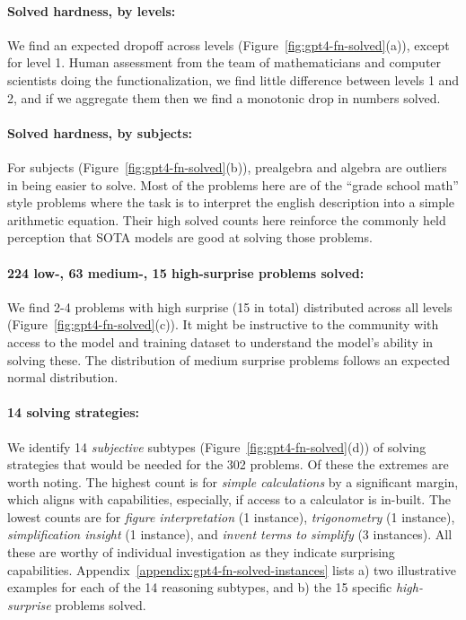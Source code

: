 \documentclass[11pt,a4paper]{article}
\begin{document}
\paragraph{Solved hardness, by levels:} We find an expected dropoff across
levels (Figure~\ref{fig:gpt4-fn-solved}(a)), except for level 1. Human
assessment from the team of mathematicians and computer scientists doing the
functionalization, we find little difference between levels 1 and 2, and if we
aggregate them then we find a monotonic drop in numbers solved.

\paragraph{Solved hardness, by subjects:} For subjects
(Figure~\ref{fig:gpt4-fn-solved}(b)), prealgebra and algebra are outliers in
being easier to solve. Most of the problems here are of the ``grade school
math'' style problems where the task is to interpret the english description
into a simple arithmetic equation. Their high solved counts here reinforce the
commonly held perception that SOTA models are good at solving those problems.

\paragraph{224 low-, 63 medium-, 15 high-surprise problems solved:} We find 2-4
problems with high surprise (15 in total) distributed across all levels
(Figure~\ref{fig:gpt4-fn-solved}(c)). It might be instructive to the community
with access to the model and training dataset to understand the model's ability
in solving these. The distribution of medium surprise problems follows an
expected normal distribution.

\paragraph{14 solving strategies:} We identify 14 {\em subjective} subtypes
(Figure~\ref{fig:gpt4-fn-solved}(d)) of solving strategies that would be needed
for the 302 problems. Of these the extremes are worth noting. The highest
count is for {\em simple calculations} by a significant margin, which aligns
with capabilities, especially, if access to a calculator is in-built. The
lowest counts are for {\em figure interpretation} (1 instance), {\em
trigonometry} (1 instance), {\em simplification insight} (1 instance), and {\em
invent terms to simplify} (3 instances). All these are worthy of individual
investigation as they indicate surprising capabilities.
Appendix~\ref{appendix:gpt4-fn-solved-instances} lists a) two illustrative
examples for each of the 14 reasoning subtypes, and b) the 15 specific {\em
high-surprise} problems solved.
\end{document}
